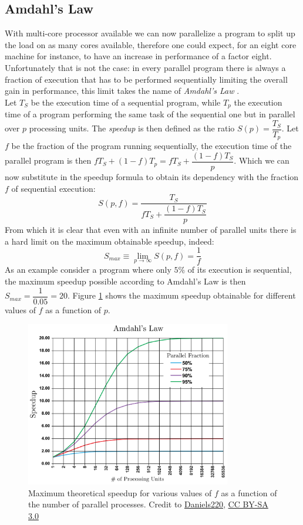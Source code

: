 \subsection{Amdahl's Law}
With multi-core processor available we can now parallelize a program to split up the load on as many cores available, therefore one could expect, for an eight core machine for instance, to have an increase in performance of a factor eight. Unfortunately that is not the case: in every parallel program there is always a fraction of execution that has to be performed sequentially limiting the overall gain in performance, this limit takes the name of \textit{Amdahl's Law} \cite{amdahl}.\\
Let $T_S$ be the execution time of a sequential program, while $T_p$ the execution time of a program performing the same task of the sequential one but in parallel over $p$ processing units. The \textit{speedup} is then defined as the ratio $S(p) = \dfrac{T_S}{T_p}$.
Let $f$ be the fraction of the program running sequentially, the execution time of the parallel program is then $f T_S + (1 - f) T_p = f T_S + \dfrac{(1-f)T_S}{p}$. Which we can now substitute in the speedup formula to obtain its dependency with the fraction $f$ of sequential execution:
\begin{equation}
S(p,f) = \dfrac{T_S}{f T_S + \dfrac{(1-f)T_S}{p}}
\end{equation}
From which it is clear that even with an infinite number of parallel units there is a hard limit on the maximum obtainable speedup, indeed:
\begin{equation}
S_{max} \equiv \lim_{p\to\infty} S(p,f) = \dfrac{1}{f}
\end{equation}
As an example consider a program where only $5\%$ of its execution is sequential, the maximum speedup possible according to Amdahl's Law is then $S_{max} = \dfrac{1}{0.05} = 20$.
Figure \ref{amdahl} shows the maximum speedup obtainable for different values of $f$ as a function of $p$.

\begin{figure}
\centerline{\includegraphics[width=0.8\textwidth]{architectures/amdahl.png}}
\caption{Maximum theoretical speedup for various values of $f$ as a function of the number of parallel processes. Credit to \href{https://en.wikipedia.org/wiki/User:Daniels220}{Daniels220}, \href{http://creativecommons.org/licenses/by-sa/3.0/}{CC BY-SA 3.0}}
\label{amdahl}
\end{figure}


